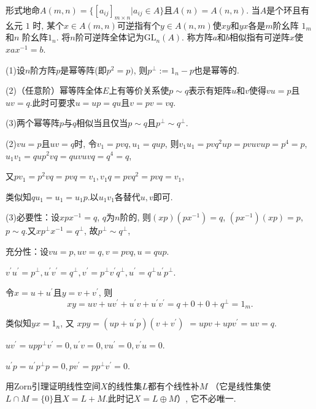 \begin{6}
形式地命$A(m, n)=\{[a_{ij}]_{m\times n}|a_{ij}\in A\}$且$A(n)=A(n, n)$. 
当$A$是个环且有幺元 $1$ 时, 某个$x\in A(m, n)$可逆指有个$y\in A(n, m)$使$xy$和$yx$各是$m$阶幺阵 $1_m$和$n$ 阶幺阵$1_n$. 
将$n$阶可逆阵全体记为$\mathrm{GL}_n(A)$. 称方阵$a$和$b$相似指有可逆阵$x$使$xax^{-1}=b$.

(1)设$n$阶方阵$p$是幂等阵(即$p^2=p)$, 则$p^\perp:=1_n-p$也是幂等的.

(2)（任意阶）幂等阵全体$E$上有等价关系使$p \sim q$表示有矩阵$u$和$v$使得$vu=p$且$uv=q$.此时可要求$u=up=qu$且$v=pv=vq$.

(3)两个幂等阵$p$与$q$相似当且仅当$p \sim q$且$p^{\perp}\sim q^{\perp}$.
\end{6}
\begin{solution}

(2)$vu=p$且$uv=q$时, 令$v_1=pvq, u_{1}=qup$,
则$v_{1}u_{1}=pvq^{2}up=pvuvup=p^4=p$, $u_{1}v_{1}=qup^{2}vq=quvuvq=q^{4}=q$,

又$pv_{1}=p^{2}vq=pvq=v_{1}, v_{1}q=pvq^{2}=pvq=v_1$,

类似知$qu_{1}=u_{1}=u_{1}p$.以$u_{1}v_{1}$各替代$u, v$即可.

(3)必要性：设$xpx^{-1}=q$, $q$为$n$阶的, 则$(xp)(px^{-1})=q$, $(px^{-1})(xp)=p$, $p \sim q$.又$xp^{\perp}x^{-1}=q^{\perp}$, 故$p^{\perp}\sim q^{\perp}$,

充分性：设$vu=p, uv=q, v=pvq, u=qup.$

$v^{\prime}u^{\prime}=p^{\perp}, u^{\prime}v^{\prime}=q^{\perp}, v^{\prime}=p^{\perp}v^{\prime}q^{\perp}, u^{\prime}=q^{\perp}u^{\prime}p^{\perp}. $

令$x=u+u^{\prime}$且$y=v+v^{\prime}$, 则
$$xy=uv+uv^{\prime}+u^{\prime}v+u^{\prime}v^{\prime}=
q+0+0+q^{\perp}=1_m. $$

类似知$yx=1_n$, 又
$xpy=\left(up+u^{\prime}p\right)\left(v+v^{\prime}\right)$
$=upv+upv^{\prime}=uv=q.$

$uv^{\prime}=upp^{\perp}v^{\prime}=0, u^{\prime}v=0, vu^{\prime}=0, v^{\prime}u=0.$

$u^{\prime}p=u^{\prime}p^{\perp}p=0, pv^{\prime}=pp^{\perp}v^{\prime}=0.$

\end{solution}

\begin{10}用Zorn引理证明线性空间$X$的线性集$L$都有个线性补$M$
（它是线性集使$L\cap M=\{0\}$且$X=L+M$.此时记$X=L\oplus M$）, 它不必唯一.
\end{10}

